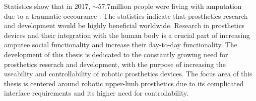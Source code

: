 \documentclass[../main.tex]{subfiles}
\begin{document}
Statistics show that in 2017, $\sim 57.7 \text{million}$ people were living with amputation due to a traumatic occourance \cite{McDonald2020}.
The statistics indicate that prosthetics research and development would be highly beneficial worldwide.
Research in prosthetics devices and their integration with the human body is a crucial part of increasing amputee social functionality and increase their day-to-day functionality.
The development of this thesis is dedicated to the constantly growing need for prosthetics reserach and development, with the purpose of increasing the useability and controllability of robotic prosthetics devices.
The focus area of this thesis is centered around robotic upper-limb prosthetics due to its complicated interface requirements and its higher need for controllability.
\end{document}
